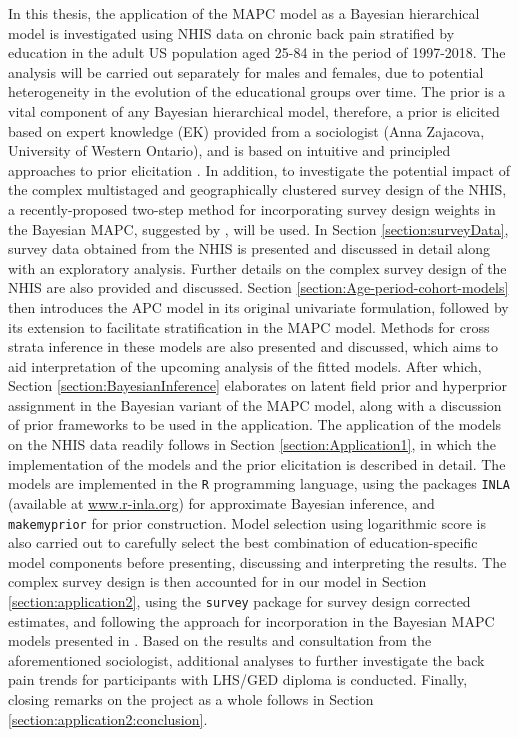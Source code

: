 In this thesis, the application of the MAPC model as a Bayesian hierarchical model is investigated using NHIS data on chronic back pain stratified by education in the adult US population aged 25-84 in the period of 1997-2018. The analysis will be carried out separately for males and females, due to potential heterogeneity in the evolution of the educational groups over time. The prior is a vital component of any Bayesian hierarchical model, therefore, a prior is elicited based on expert knowledge (EK) provided from a sociologist (Anna Zajacova, University of Western Ontario), and is based on intuitive and principled approaches to prior elicitation \citep{PC-priors,Jointprior}. In addition, to investigate the potential impact of the complex multistaged and geographically clustered survey design of the NHIS, a recently-proposed two-step method for incorporating survey design weights in the Bayesian MAPC, suggested by \cite{SurveyDesignMercer}, will be used. In Section \ref{section:surveyData}, survey data obtained from the NHIS is presented and discussed in detail along with an exploratory analysis. Further details on the complex survey design of the NHIS are also provided and discussed. Section \ref{section:Age-period-cohort-models} then introduces the APC model in its original univariate formulation, followed by its extension to facilitate stratification in the MAPC model. Methods for cross strata inference in these models are also presented and discussed, which aims to aid interpretation of the upcoming analysis of the fitted models. After which, Section \ref{section:BayesianInference} elaborates on latent field prior and hyperprior assignment in the Bayesian variant of the MAPC model, along with a discussion of prior frameworks to be used in the application. The application of the models on the NHIS data readily follows in Section \ref{section:Application1}, in which the implementation of the models and the prior elicitation is described in detail. The models are implemented in the \texttt{R} programming language, using the packages \texttt{INLA} (available at \url{www.r-inla.org}) for approximate Bayesian inference, and \texttt{makemyprior} \citep{MMPPackage, MMP} for prior construction. Model selection using logarithmic score \citep{proper-scoring} is also carried out to carefully select the best combination of education-specific model components before presenting, discussing and interpreting the results. The complex survey design is then accounted for in our model in Section \ref{section:application2}, using the \texttt{survey} package for survey design corrected estimates, and following the approach for incorporation in the Bayesian MAPC models presented in \cite{SurveyDesignMercer}. Based on the results and consultation from the aforementioned sociologist, additional analyses to further investigate the back pain trends for participants with LHS/GED diploma is conducted. Finally, closing remarks on the project as a whole follows in Section \ref{section:application2:conclusion}.


